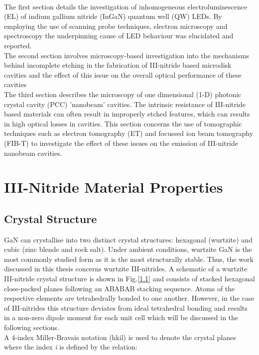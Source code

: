 \\The first section details the investigation of inhomogeneous electroluminescence  (EL) of indium gallium nitride (InGaN) quantum well (QW) LEDs. By employing the use of scanning probe techniques, electron microscopy and spectroscopy the underpinning cause of LED behaviour was elucidated and reported.
\\The second section involves microscopy-based investigation into the mechanisms behind incomplete etching in the fabrication of III-nitride based microdisk cavities and the effect of this issue on the overall optical performance of these cavities
\\The third section describes the microscopy of one dimensional  (1-D) photonic crystal cavity (PCC) 'nanobeam' cavities. The intrinsic resistance of III-nitride based materials can often result in improperly etched features, which can results in high optical losses in cavities. This section concerns the use of tomographic techniques such as electron tomography  (ET) and focussed ion beam tomography  (FIB-T) to investigate the effect of these issues on the emission of III-nitride nanobeam cavities. 

\section{III-Nitride Material Properties } %

\subsection{Crystal Structure}
\label{section1.1.1}

GaN can crystallise into two distinct crystal structures: hexagonal (wurtzite) and cubic (zinc blende and rock salt). Under ambient conditions, wurtzite GaN is the most commonly studied form as it is the most structurally stable. Thus, the work discussed in this thesis concerns wurtzite III-nitrides. A schematic of a wurtzite III-nitride crystal structure is shown in Fig.\ref{1.1} and consists of stacked hexagonal close-packed planes following an ABABAB stacking sequence. Atoms of the respective elements are tetrahedrally bonded to one another. However, in the case of III-nitrides this structure deviates from ideal tetrahedral bonding and results in a non-zero dipole moment for each unit cell which will be discussed in the following sections.
\\ A 4-index Miller-Bravais notation (hkil) is used to denote the crystal planes where the index {\it i} is defined by the relation:


